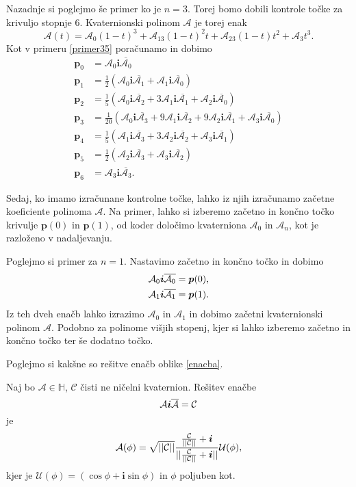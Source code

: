 \documentclass[mat1]{fmfdelo}
\newcommand{\HH}{\mathbb H}
\newcommand{\ii}{\boldsymbol i}
\newcommand{\pp}{\boldsymbol p}
\newcommand{\A}{\mathcal A}
\newcommand{\CC}{\mathcal C}
\begin{document}
\begin{primer}
	Nazadnje si poglejmo še primer ko je $n=3$. Torej bomo dobili kontrole točke za krivuljo stopnje $6$. Kvaternionski polinom $\A$ je torej enak
	\begin{equation*}
	\A(t) = \A_0(1-t)^3+\A_13(1-t)^2t+\A_23(1-t)t^2+\A_3t^3.
	\end{equation*}
	Kot v primeru \ref{primer35} poračunamo in dobimo
	\begin{equation*}
	\begin{split}
	\pp_0 &= \A_0\ii\overline{\A_0} \\
	\pp_1 &= \frac{1}{2} (\A_0\ii\overline{\A_1}+\A_1\ii\overline{\A_0}) \\
	\pp_2 &= \frac{1}{5} (\A_0\ii\overline{\A_2} + 3\A_1\ii\overline{\A_1} + \A_2 \ii \overline{\A_0}) \\
	\pp_3 &= \frac{1}{20} (\A_0\ii\overline{\A_3}+9\A_1\ii\overline{\A_2}+9\A_2\ii\overline{\A_1}+\A_3\ii\overline{\A_0}) \\
	\pp_4&= \frac{1}{5} (\A_1\ii\overline{\A_3}+3\A_2\ii\overline{\A_2}+\A_3\ii\overline{\A_1}) \\
	\pp_5 &= \frac{1}{2} (\A_2\ii\overline{\A_3}+\A_3\ii\overline{\A_2}) \\
	\pp_6 &= \A_3 \ii \overline{\A_3}.
	\end{split}
	\end{equation*}
\end{primer}
Sedaj, ko imamo izračunane kontrolne točke, lahko iz njih izračunamo začetne koeficiente polinoma $\A$. Na primer, lahko si izberemo začetno in končno točko krivulje $\pp(0)$ in $\pp(1)$, od koder določimo kvaterniona $\A_0$ in  $\A_n$, kot je razloženo v nadaljevanju.
\begin{primer}Poglejmo si primer za	$n=1$. Nastavimo začetno in končno točko in dobimo
	\begin{equation}{\label{enacba}}
	\begin{split}
		\A_0\ii\overline{\A_0} &= \pp(0), \\
		\A_1\ii\overline{\A_1} &= \pp(1).
	\end{split}
\end{equation}
Iz teh dveh enačb lahko izrazimo $\A_0$ in $\A_1$ in dobimo začetni kvaternionski polinom $\A$. Podobno za polinome višjih stopenj, kjer si lahko izberemo začetno in končno točko ter še dodatno točko.	
\end{primer}
Poglejmo si kakšne so rešitve enačb oblike \ref{enacba}.
\begin{trditev}
	Naj bo $\A \in \HH$, $\CC$ čisti ne ničelni kvaternion. Rešitev enačbe 
	\begin{equation}{\label{aia}}
		\A \ii \overline{\A} = \CC
	\end{equation}
	 je
	\begin{equation}{\label{kvat_resitev}}
		\A(\phi) = \sqrt{||\CC||} \frac{\frac{\CC}{||\CC||} + \ii}{||\frac{\CC}{||\CC||} + \ii||} \mathcal{U}(\phi),
	\end{equation}
	kjer je $\mathcal{U}(\phi) = (\cos\phi + \ii \sin \phi)$ in $\phi$ poljuben kot.
\end{trditev}
\end{document}
